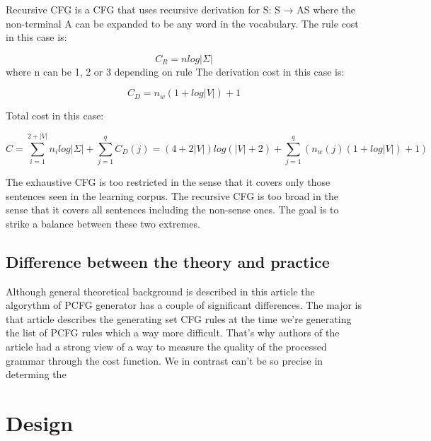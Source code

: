 \documentclass[paper=a4, fontsize=11pt]{scrartcl} %
\numberwithin{equation}{section} %
\numberwithin{figure}{section} %
\numberwithin{table}{section} %
\begin{document}
\begin{enumerate}[1.]
Recursive CFG is a CFG that uses recursive derivation for S: S → AS where the non-terminal A can be expanded to be any word in the vocabulary.
The rule cost in this case is:

\begin{equation}\label{first}
C_R = n log \lvert \Sigma \rvert
\end{equation}
where n can be 1, 2 or 3 depending on rule
The derivation cost in this case is:

\begin{equation}\label{first}
C_D = n_w(1 + log \lvert V \rvert) + 1
\end{equation}

Total cost in this case:

\begin{equation}\label{first}
C = \sum \limits_{i=1}^{2+\lvert V \rvert}n_i log \lvert \Sigma \rvert + \sum \limits_{j=1}^q C_D(j) = (4 + 2\lvert V \rvert)log(\lvert V \rvert + 2) + \sum \limits_{j=1}^q (n_w(j)(1 + log \lvert V \rvert) + 1)
\end{equation}

\end{enumerate}

The exhaustive CFG is too restricted in the sense that it covers only those sentences seen in the learning corpus. The recursive CFG is too broad in the sense that it covers all sentences including the non-sense ones. The goal is to strike a balance between these two extremes.

\subsection{Difference between the theory and practice}
Although general theoretical background is described in this article the algorythm of PCFG generator has a couple of significant differences. The major is that article describes the generating set CFG rules at the time we're generating the list of PCFG rules which a way more difficult. That's why authors of the article had a strong view of a way to measure the quality of the processed grammar through the cost function. We in contrast can't be so precise in determing the 


\section{Design}
\end{document}
